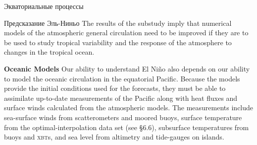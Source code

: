 \begin{chapter}{Экваториальные процессы}
\begin{section}{Предсказание Эль-Ниньо}
The results of the substudy imply that numerical models of the
atmospheric general circulation need to be improved if they are to be
used to study tropical variability and the response of the atmosphere
to changes in the tropical ocean.
%

\textbf{Oceanic Models} Our ability to understand El Ni\~{n}o also
depends on our ability to model the oceanic circulation in the
equatorial Pacific. Because the models provide the initial conditions
used for the forecasts, they must be able to assimilate up-to-date
measurements of the Pacific along with heat fluxes
and surface winds calculated from the atmospheric models. The
measurements include sea-surface winds from
scatterometers
and moored buoys, surface temperature from the optimal-interpolation
data set (see \S6.6), subsurface temperatures from buoys and
\textsc{xbt}s, and sea level from altimetry and tide-gauges on
islands.
%


\end{section}
\end{chapter}
